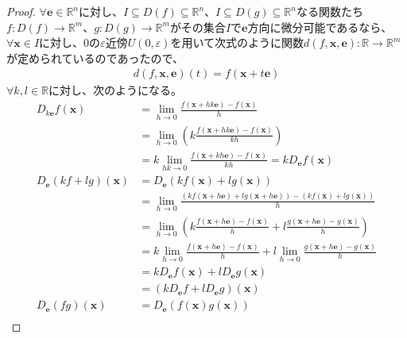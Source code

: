 \documentclass[dvipdfmx]{jsarticle}
\begin{document}
\begin{proof}
$\forall\mathbf{e} \in \mathbb{R}^{n}$に対し、$I \subseteq D(f) \subseteq \mathbb{R}^{n}$、$I \subseteq D(g) \subseteq \mathbb{R}^{n}$なる関数たち$f:D(f) \rightarrow \mathbb{R}^{m}$、$g:D(g) \rightarrow \mathbb{R}^{m}$がその集合$I$で$\mathbf{e}$方向に微分可能であるなら、$\forall\mathbf{x} \in I$に対し、0の$\varepsilon$近傍$U(0,\varepsilon)$を用いて次式のように関数$d\left( f,\mathbf{x},\mathbf{e} \right):\mathbb{R} \rightarrow \mathbb{R}^{m}$が定められているのであったので、
\begin{align*}
d\left( f,\mathbf{x},\mathbf{e} \right)(t) = f\left( \mathbf{x} + t\mathbf{e} \right)
\end{align*}
$\forall k,l \in \mathbb{R}$に対し、次のようになる。
\begin{align*}
D_{k\mathbf{e}}f\left( \mathbf{x} \right) &= \lim_{h \rightarrow 0}\frac{f\left( \mathbf{x} + hk\mathbf{e} \right) - f\left( \mathbf{x} \right)}{h} \\
&= \lim_{h \rightarrow 0}\left( k\frac{f\left( \mathbf{x} + hk\mathbf{e} \right) - f\left( \mathbf{x} \right)}{kh} \right)\\
&= k\lim_{hk \rightarrow 0}\frac{f\left( \mathbf{x} + kh\mathbf{e} \right) - f\left( \mathbf{x} \right)}{kh} = kD_{\mathbf{e}}f\left( \mathbf{x} \right)\\
D_{\mathbf{e}}(kf + lg)\left( \mathbf{x} \right) &= D_{\mathbf{e}}\left( kf\left( \mathbf{x} \right) + lg\left( \mathbf{x} \right) \right)\\
&= \lim_{h \rightarrow 0}\frac{\left( kf\left( \mathbf{x} + h\mathbf{e} \right) + lg\left( \mathbf{x} + h\mathbf{e} \right) \right) - \left( kf\left( \mathbf{x} \right) + lg\left( \mathbf{x} \right) \right)}{h}\\
&= \lim_{h \rightarrow 0}\left( k\frac{f\left( \mathbf{x} + h\mathbf{e} \right) - f\left( \mathbf{x} \right)}{h} + l\frac{g\left( \mathbf{x} + h\mathbf{e} \right) - g\left( \mathbf{x} \right)}{h} \right)\\
&= k\lim_{h \rightarrow 0}\frac{f\left( \mathbf{x} + h\mathbf{e} \right) - f\left( \mathbf{x} \right)}{h} + l\lim_{h \rightarrow 0}\frac{g\left( \mathbf{x} + h\mathbf{e} \right) - g\left( \mathbf{x} \right)}{h}\\
&= kD_{\mathbf{e}}f\left( \mathbf{x} \right) + lD_{\mathbf{e}}g\left( \mathbf{x} \right)\\
&= \left( kD_{\mathbf{e}}f + lD_{\mathbf{e}}g \right)\left( \mathbf{x} \right)\\
D_{\mathbf{e}}(fg)\left( \mathbf{x} \right) &= D_{\mathbf{e}}\left( f\left( \mathbf{x} \right)g\left( \mathbf{x} \right) \right)\\

\end{align*}
\end{proof}
\end{document}
